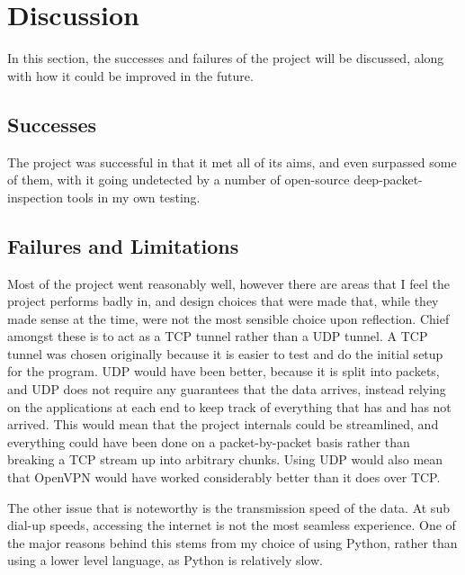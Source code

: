 \section{Discussion}
In this section, the successes and failures of the project will be discussed, along with how it could be improved in the future.
\subsection{Successes}
The project was successful in that it met all of its aims, and even surpassed some of them, with it going undetected by a number of open-source deep-packet-inspection tools in my own testing.

\subsection{Failures and Limitations}
Most of the project went reasonably well, however there are areas that I feel the project performs badly in, and design choices that were made that, while they made sense at the time, were not the most sensible choice upon reflection.
Chief amongst these is to act as a TCP tunnel rather than a UDP tunnel. A TCP tunnel was chosen originally because it is easier to test and do the initial setup for the program.
UDP would have been better, because it is split into packets, and UDP does not require any guarantees that the data arrives, instead relying on the applications at each end to keep track of everything that has and has not arrived.
This would mean that the project internals could be streamlined, and everything could have been done on a packet-by-packet basis rather than breaking a TCP stream up into arbitrary chunks.
Using UDP would also mean that OpenVPN would have worked considerably better than it does over TCP\@.\par
The other issue that is noteworthy is the transmission speed of the data.
At sub dial-up speeds, accessing the internet is not the most seamless experience.
One of the major reasons behind this stems from my choice of using Python, rather than using a lower level language, as Python is relatively slow.
